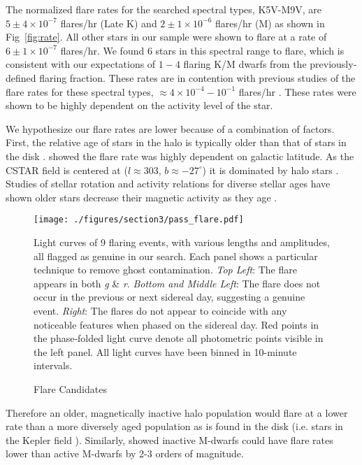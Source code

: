 The normalized flare rates for the searched spectral types, K5V-M9V, are  $5\pm4\times10^{-7}$ flares/hr (Late K) and $2\pm1\times10^{-6}$  flares/hr (M) as shown in Fig~\ref{fig:rate}. All other stars in our sample were shown to flare at a rate of $6\pm1\times10^{-7}$ flares/hr. We found 6 stars in this spectral range to flare, which is consistent with our expectations of $1-4$ flaring K/M dwarfs from the previously-defined flaring fraction. These rates are in contention with previous studies of the flare rates for these spectral types, $\approx 4\times10^{-4}-10^{-1}$ flares/hr \citep{Davenport2012, Hawley2014}. These rates were shown to be highly dependent on the activity level of the star.

We hypothesize our flare rates are lower because of a combination of factors. First, the relative age of stars in the halo is typically older than that of stars in the disk \citep{Jofre2011}. \citet{Kowalski2009} showed the flare rate was highly dependent on galactic latitude. As the CSTAR field is centered at ($l\approx303$, $b\approx-27^{\circ}$) it is dominated by halo stars \citep{Wang2013, Oelkers2015}. Studies of stellar rotation and activity relations for diverse stellar ages have shown older stars decrease their magnetic activity as they age \citep{Garcia2014}. 

\begin{figure}[H]
\begin{center}
\singlespace
\texttt{[image: ./figures/section3/pass\_flare.pdf]}
\end{center}
\singlespace
\caption{Flare Candidates}  Light curves of 9 flaring events, with various lengths and amplitudes, all flagged as genuine in our search. Each panel shows a particular technique to remove ghost contamination. \textit{Top Left}: The flare appears in both \textit{g} \& \textit{r}. \textit{Bottom and Middle Left}: The flare does not occur in the previous or next sidereal day, suggesting a genuine event. \textit{Right}: The flares do not appear to coincide with any noticeable features when phased on the sidereal day. Red points in the phase-folded light curve denote all photometric points visible in the left panel. All light curves have been binned in 10-minute intervals. \label{fig:flares}
\end{figure}
Therefore an older, magnetically inactive halo population would flare at a lower rate than a more diversely aged population as is found in the disk (i.e. stars in the Kepler field \citep{Hawley2014}). Similarly, \citet{Hawley2014} showed inactive M-dwarfs could have flare rates lower than active M-dwarfs by 2-3 orders of magnitude.  

